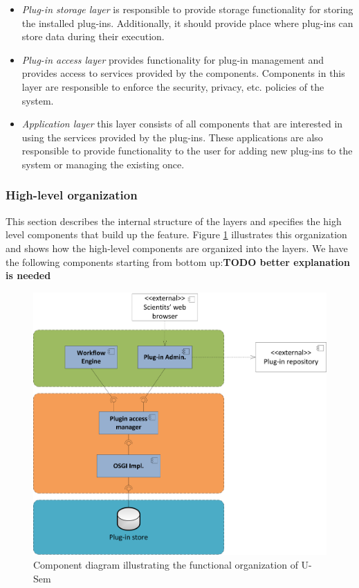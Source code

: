 \begin{itemize}
	\item \textit{Plug-in storage layer} is responsible to provide storage functionality for storing the installed plug-ins. Additionally, it should provide place where plug-ins can store data during their execution.
	\item \textit{Plug-in access layer} provides functionality for plug-in management and provides access to services provided by the components. Components in this layer are responsible to enforce the security, privacy, etc. policies of the system.
	\item \textit{Application layer} this layer consists of all components that are interested in using the services provided by the plug-ins. These applications are also responsible to provide functionality to the user for adding new plug-ins to the system or managing the existing once. 
	\end{itemize}

\subsubsection{High-level organization}

This section describes the internal structure of the layers and specifies the high level components that build up the feature. Figure \ref{fig_comp} illustrates this organization and shows how the high-level components are organized into the layers. We have the following components starting from bottom up:\textbf{TODO better explanation is needed}

\begin{figure}[h!]
  \centering
  	\includegraphics[scale=0.6]{plug-in/layers/main-func.png}
  \caption{Component diagram illustrating the functional organization of U-Sem}
  \label{fig_comp}
\end{figure}

